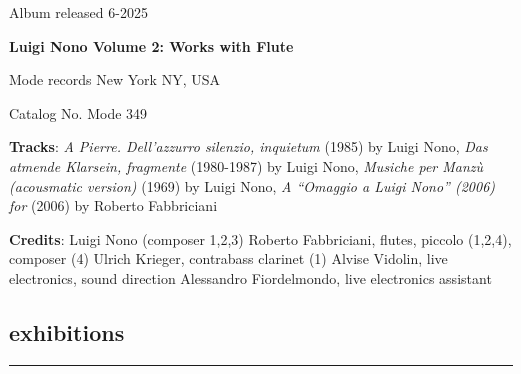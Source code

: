 \documentclass[7pt,a4paper]{article}
\begin{document}
\begin{mdframed}[
    backgroundcolor=entrygray,
    linecolor=entrygray,
    linewidth=0pt,
    innerleftmargin=6pt,
    innerrightmargin=6pt,
    innertopmargin=6pt,
    innerbottommargin=6pt,
    skipabove=0pt,
    skipbelow=0pt
]

\noindent
\scriptsize Album released 6-2025\\
\par\textbf{\normalsize Luigi Nono Volume 2: Works with Flute}
\par
\small
\small Mode records  \scriptsize New York NY, USA 

\scriptsize Catalog No. Mode 349


\vspace{0.15cm}

\par \scriptsize \textbf{Tracks}: \textit{A Pierre. Dell’azzurro silenzio, inquietum} (1985) by Luigi Nono, \textit{Das atmende Klarsein, fragmente} (1980-1987) by Luigi Nono, \textit{Musiche per Manzù (acousmatic version)} (1969) by Luigi Nono, \textit{A “Omaggio a Luigi Nono” (2006) for } (2006) by Roberto Fabbriciani



\par\scriptsize\textbf{Credits}: \scriptsize Luigi Nono (composer 1,2,3)
Roberto Fabbriciani, flutes, piccolo (1,2,4), composer (4)
Ulrich Krieger, contrabass clarinet (1)
Alvise Vidolin, live electronics, sound direction
Alessandro Fiordelmondo, live electronics assistant

\vspace{0.15cm}
\end{mdframed}





















\newpage
\subsection*{exhibitions}
\normalsize
\vspace{-0.5cm}
\rule{\textwidth}{0.4pt}
\vspace{0.1cm}
\end{document}
